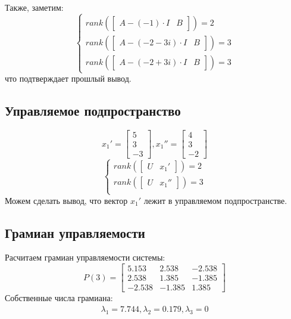 Также, заметим:
\begin{equation*}
    \begin{cases}
        rank(\begin{bmatrix}
            A - (-1)\cdot I &  B
        \end{bmatrix} ) = 2 \\
        rank(\begin{bmatrix}
            A - (-2-3i)\cdot I &  B
        \end{bmatrix} ) = 3 \\
        rank(\begin{bmatrix}
            A - (-2+3i)\cdot I &  B
        \end{bmatrix} ) = 3
    \end{cases}
\end{equation*}
что подтверждает прошлый вывод.

\subsection{Управляемое подпространство}
\begin{equation*}
    x_1' = \begin{bmatrix}
        5 \\
        3 \\
        -3
    \end{bmatrix},
    x_1'' = \begin{bmatrix}
        4 \\
        3 \\
        -2
    \end{bmatrix}
\end{equation*}
\begin{equation*}
    \begin{cases}
        rank(\begin{bmatrix}
            U &  x_1'
        \end{bmatrix} ) = 2 \\
        rank(\begin{bmatrix}
            U &  x_1''
        \end{bmatrix} ) = 3 \\
    \end{cases}
\end{equation*}
Можем сделать вывод, что вектор $x_1'$ лежит в управляемом подпространстве.

\subsection{Грамиан управляемости}
Расчитаем грамиан управляемости системы:
\begin{equation*}
    P(3) = \begin{bmatrix}
        5.153 & 2.538 & -2.538 \\
        2.538 & 1.385 & -1.385 \\
        -2.538 & -1.385 & 1.385
        \end{bmatrix}
\end{equation*}
Собственные числа грамиана:
\begin{eqnarray*}
    \lambda_1 = 7.744, \lambda_2 = 0.179, \lambda_3 = 0
\end{eqnarray*}


